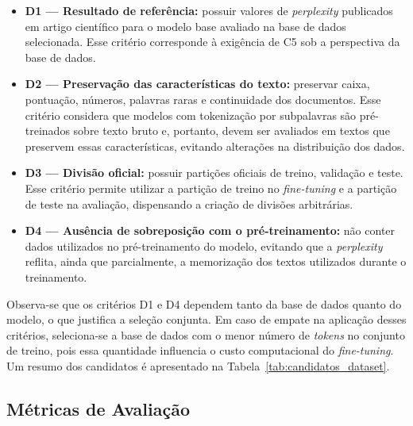 \begin{itemize}
    \item \textbf{D1 --- Resultado de referência:} possuir valores de \textit{perplexity}
          publicados em artigo científico para o modelo base avaliado na base de dados
          selecionada. Esse critério corresponde à exigência de C5 sob a perspectiva da base
          de dados.
    \item \textbf{D2 --- Preservação das características do texto:} preservar caixa,
          pontuação, números, palavras raras e continuidade dos documentos. Esse critério
          considera que modelos com tokenização por subpalavras são pré-treinados sobre
          texto bruto e, portanto, devem ser avaliados em textos que preservem essas
          características, evitando alterações na distribuição dos dados.
    \item \textbf{D3 --- Divisão oficial:} possuir partições oficiais de treino, validação e
          teste. Esse critério permite utilizar a partição de treino no
          \textit{fine-tuning} e a partição de teste na avaliação, dispensando a criação de
          divisões arbitrárias.
    \item \textbf{D4 --- Ausência de sobreposição com o pré-treinamento:} não conter dados
          utilizados no pré-treinamento do modelo, evitando que a \textit{perplexity}
          reflita, ainda que parcialmente, a memorização dos textos utilizados durante o
          treinamento.
\end{itemize}

Observa-se que os critérios D1 e D4 dependem tanto da base de dados quanto do modelo, o que
justifica a seleção conjunta. Em caso de empate na aplicação desses critérios, seleciona-se
a base de dados com o menor número de \textit{tokens} no conjunto de treino, pois essa
quantidade influencia o custo computacional do \textit{fine-tuning}. Um resumo dos
candidatos é apresentado na Tabela~\ref{tab:candidatos_dataset}.

\subsection{Métricas de Avaliação}\label{sec:metodologia_metricas}

